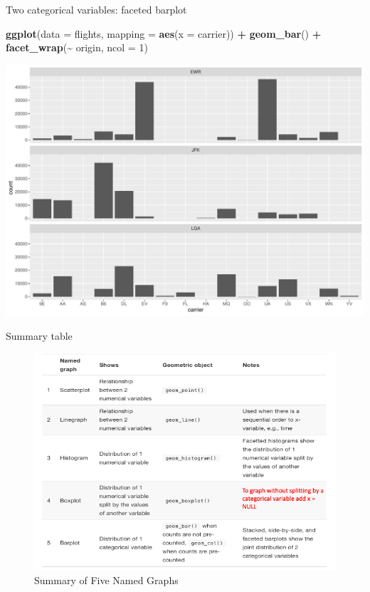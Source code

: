 \documentclass[
  ignorenonframetext,
]{beamer}
\newenvironment{Shaded}{\begin{snugshade}}{\end{snugshade}}
\newcommand{\AttributeTok}[1]{\textcolor[rgb]{0.13,0.29,0.53}{#1}}
\newcommand{\DecValTok}[1]{\textcolor[rgb]{0.00,0.00,0.81}{#1}}
\newcommand{\FunctionTok}[1]{\textcolor[rgb]{0.13,0.29,0.53}{\textbf{#1}}}
\newcommand{\NormalTok}[1]{#1}
\newcommand{\SpecialCharTok}[1]{\textcolor[rgb]{0.81,0.36,0.00}{\textbf{#1}}}
\begin{document}
\begin{frame}[fragile]{Two categorical variables: faceted barplot}
\protect\hypertarget{two-categorical-variables-faceted-barplot}{}
\tiny

\begin{Shaded}
\begin{Highlighting}[]
\FunctionTok{ggplot}\NormalTok{(}\AttributeTok{data =}\NormalTok{ flights, }\AttributeTok{mapping =} \FunctionTok{aes}\NormalTok{(}\AttributeTok{x =}\NormalTok{ carrier)) }\SpecialCharTok{+}
  \FunctionTok{geom\_bar}\NormalTok{() }\SpecialCharTok{+}
  \FunctionTok{facet\_wrap}\NormalTok{(}\SpecialCharTok{\textasciitilde{}}\NormalTok{ origin, }\AttributeTok{ncol =} \DecValTok{1}\NormalTok{)}
\end{Highlighting}
\end{Shaded}

\begin{center}\includegraphics[width=0.7\linewidth,height=0.6\textheight]{Week2_Lect_files/figure-beamer/unnamed-chunk-47-1} \end{center}
\normalsize
\end{frame}

\begin{frame}{Summary table}
\protect\hypertarget{summary-table}{}
\begin{figure}[h]

{\centering \includegraphics[width=0.8\linewidth,height=0.7\textheight]{week2_5} 

}

\caption{Summary of Five Named Graphs}\label{fig:unnamed-chunk-48}
\end{figure}
\end{frame}
\end{document}
